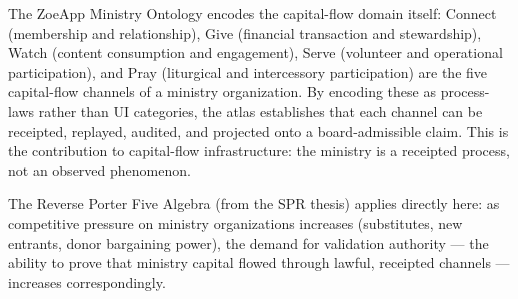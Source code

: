 The ZoeApp Ministry Ontology encodes the capital-flow domain itself: Connect
(membership and relationship), Give (financial transaction and stewardship),
Watch (content consumption and engagement), Serve (volunteer and operational
participation), and Pray (liturgical and intercessory participation) are the
five capital-flow channels of a ministry organization. By encoding these as
process-laws rather than UI categories, the atlas establishes that each channel
can be receipted, replayed, audited, and projected onto a board-admissible
claim. This is the contribution to capital-flow infrastructure: the ministry
is a receipted process, not an observed phenomenon.

The Reverse Porter Five Algebra (from the SPR thesis) applies directly here:
as competitive pressure on ministry organizations increases (substitutes,
new entrants, donor bargaining power), the demand for validation authority
--- the ability to prove that ministry capital flowed through lawful, receipted
channels --- increases correspondingly.
